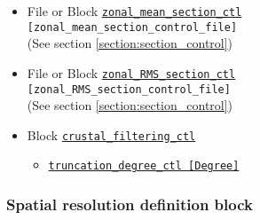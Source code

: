 \begin{itemize}
\begin{itemize}
		\item File or Block \hyperref[href_t:zonal_mean_section_ctl]
							{\tt zonal\_mean\_section\_ctl} \\
							{\tt [zonal\_mean\_section\_control\_file]} \\
								(See section \ref{section:section_control})
		\item File or Block \hyperref[href_t:zonal_RMS_section_ctl]
							{\tt zonal\_RMS\_section\_ctl} \\
                            {\tt [zonal\_RMS\_section\_control\_file]} \\
                                (See section \ref{section:section_control})
%
		\item Block \hyperref[href_t:crustal_filtering_ctl]{\tt crustal\_filtering\_ctl}
			\begin{itemize}
				\item \hyperref[href_t:crustal_filtering_ctl]
						{\tt truncation\_degree\_ctl          [Degree]}
			\end{itemize}
	\end{itemize}
\end{itemize}
%
%
%
\subsubsection{Spatial resolution definition block}
\label{section:resolution_block}

